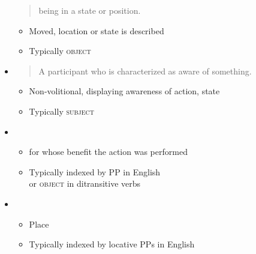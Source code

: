 \documentclass[headrule,footrule]{foils}
\begin{document}
\begin{itemize}
\begin{quote}
being in a state or position. 
  \end{quote}
  \begin{itemize}
  \item  Moved, location or state is described
  \item Typically \textsc{object}
\end{itemize}
\begin{exe}
  \ex {}
  \ex {}
  \ex {}
  \ex {}
  \ex *
\end{exe}
\newpage

\item  {}
  \begin{quote}
    A participant who is characterized as aware of something.
  \end{quote}
  \begin{itemize}
  \item   Non-volitional, displaying awareness of action, state
  \item Typically \textsc{subject}
  \end{itemize}
  \begin{exe}
  \ex{}
  \ex{}
  \ex{}
\end{exe}
\newpage
\item  {}
  \begin{itemize}
  \item   for whose benefit the action was performed
  \item   Typically indexed by  PP in English
    \\ or \textsc{object} in ditransitive verbs
  \end{itemize}
  \begin{exe}
  \ex{}
  \ex{}
\end{exe}

\item  {}
  \begin{itemize}
  \item  Place
  \item Typically indexed by locative PPs in English
  \end{itemize}
  \begin{exe}
  \ex{}
  \ex{}
\end{exe}
\newpage  


\end{itemize}
\end{document}
